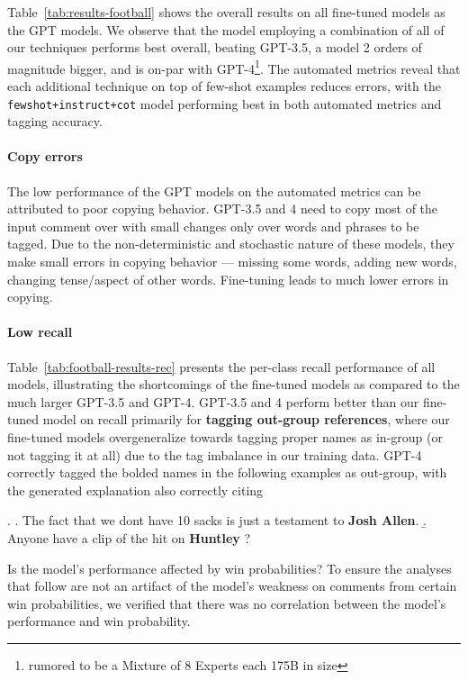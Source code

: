 

Table~\ref{tab:results-football} shows the overall results on all fine-tuned models as the GPT models. We observe that the model employing a combination of all of our techniques performs best overall, beating GPT-3.5, a model 2 orders of magnitude bigger, and is on-par with GPT-4\footnote{rumored to be a Mixture of 8 Experts each 175B in size}. The automated metrics reveal that each additional technique on top of few-shot examples reduces errors, with the \texttt{fewshot+instruct+cot} model performing best in both automated metrics and tagging accuracy.

\paragraph{Copy errors} The low performance of the GPT models on the automated metrics can be attributed to poor copying behavior. GPT-3.5 and 4 need to copy most of the input comment over with small changes only over words and phrases to be tagged. Due to the non-deterministic and stochastic nature of these models, they make small errors in copying behavior --- missing some words, adding new words, changing tense/aspect of other words. Fine-tuning leads to much lower errors in copying.

\paragraph{Low recall} Table~\ref{tab:football-results-rec} presents the per-class recall performance of all models, illustrating the shortcomings of the fine-tuned models as compared to the much larger GPT-3.5 and GPT-4. GPT-3.5 and 4 perform better than our fine-tuned model on recall primarily for \textbf{tagging out-group references}, where our fine-tuned models overgeneralize towards tagging proper names as in-group (or not tagging it at all) due to the tag imbalance in our training data. GPT-4 correctly tagged the bolded names in the following examples as out-group, with the generated explanation also correctly citing 

\ex. \a. The fact that we dont have 10 sacks is just a testament to \textbf{Josh Allen}.
     \b. Anyone have a clip of the hit on \textbf{Huntley} ?



Is the model's performance affected by win probabilities? To ensure the analyses that follow are not an artifact of the model's weakness on comments from certain win probabilities, we verified that there was no correlation between the model's performance and win probability.


